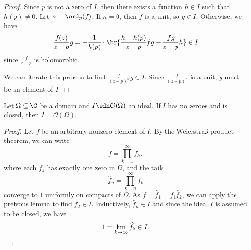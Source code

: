 \begin{proof}
Since $p$ is not a zero of $I$, then there exists a function
$h \in I$ such that $h(p) \ne 0$. Let $n = \ord_p(f)$. If $n=0$,
then $f$ is a unit, so $g \in I$. Otherwise, we have
\[
\frac{f(z)}{z - p}g =
-\frac{1}{h(p)} \cdot
\br{\frac{h - h(p)}{z - p} fg - \frac{f g}{z - p} h} \in I
\]
since $\frac{f}{z - p}$ is holomorphic.
    
We can iterate this process to find $\frac{f}{(z - p)^n} g \in I$.
Since $\frac{f}{(z - p)^n}$ is a unit, $g$ must be an element of
$I$.
\end{proof}

\begin{izrek}
Let $\Omega \subseteq \C$ be a domain and
$I \edn \mathcal{O}(\Omega)$ an ideal. If $I$ has no zeroes and is
closed, then $I = \mathcal{O}(\Omega)$.
\end{izrek}

\begin{proof}
Let $f$ be an arbitrary nonzero element of $I$. By the Weierstraß
product theorem, we can write
\[
f = \prod_{k = 1}^{\infty} f_k,
\]
where each $f_k$ has exactly one zero in $\Omega$, and the tails
\[
\widehat{f}_n = \prod_{k = n}^{\infty} f_k
\]
converge to $1$ uniformly on compacts of $\Omega$. As
$f = \widehat{f}_1 = f_1 \widehat{f}_2$, we can apply the preivous
lemma to find $\widehat{f}_2 \in I$. Inductively,
$\widehat{f}_n \in I$ and since the ideal $I$ is assumed to be
closed, we have
\[
1 = \lim_{k \to \infty} \widehat{f}_k \in I. \qedhere
\]
\end{proof}

